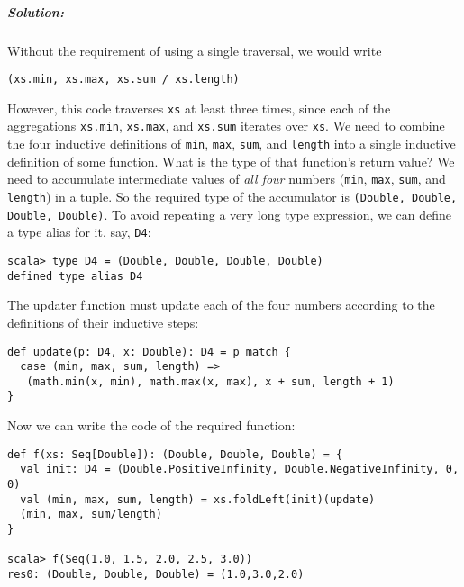 \subparagraph{Solution:}

Without the requirement of using a single traversal, we would write
\begin{lstlisting}
(xs.min, xs.max, xs.sum / xs.length)
\end{lstlisting}
However, this code traverses \lstinline!xs!
at least three times, since each of the aggregations \lstinline!xs.min!,
\lstinline!xs.max!, and
\lstinline!xs.sum! iterates
over \lstinline!xs!. We
need to combine the four inductive definitions of \lstinline!min!,
\lstinline!max!, \lstinline!sum!,
and \lstinline!length!
into a single inductive definition of some function. What is the type
of that function's return value? We need to accumulate intermediate
values of \emph{all four} numbers (\lstinline!min!,
\lstinline!max!, \lstinline!sum!,
and \lstinline!length!)
in a tuple. So the required type of the accumulator is \lstinline!(Double, Double, Double, Double)!.
To avoid repeating a very long type expression, we can define a type
alias for it, say, \lstinline!D4!:
\begin{lstlisting}
scala> type D4 = (Double, Double, Double, Double)
defined type alias D4 
\end{lstlisting}
The updater function must update each of the four numbers according
to the definitions of their inductive steps:
\begin{lstlisting}
def update(p: D4, x: Double): D4 = p match {
  case (min, max, sum, length) =>
   (math.min(x, min), math.max(x, max), x + sum, length + 1)
}
\end{lstlisting}
Now we can write the code of the required function:
\begin{lstlisting}
def f(xs: Seq[Double]): (Double, Double, Double) = {
  val init: D4 = (Double.PositiveInfinity, Double.NegativeInfinity, 0, 0)
  val (min, max, sum, length) = xs.foldLeft(init)(update)
  (min, max, sum/length)
}

scala> f(Seq(1.0, 1.5, 2.0, 2.5, 3.0))
res0: (Double, Double, Double) = (1.0,3.0,2.0)
\end{lstlisting}


